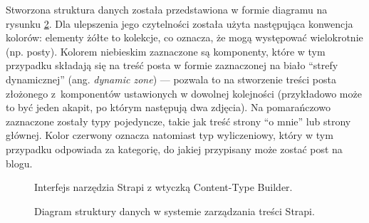 \documentclass[a4paper, 12pt, twoside]{article}
\numberwithin{figure}{section}
\begin{document}
\begin{sloppypar}
Stworzona struktura danych została przedstawiona w formie diagramu na rysunku \ref{fig:diagram-typu-tresci.png}. Dla ulepszenia jego czytelności została użyta następująca konwencja kolorów: elementy żółte to kolekcje, co oznacza, że mogą występować wielokrotnie (np. posty). Kolorem niebieskim zaznaczone są komponenty, które w tym przypadku składają się na treść posta w formie zaznaczonej na biało ``strefy dynamicznej'' (ang. \textit{dynamic zone}) --- pozwala to na stworzenie treści posta złożonego z~komponentów ustawionych w dowolnej kolejności (przykładowo może to być jeden akapit, po którym następują dwa zdjęcia). Na pomarańczowo zaznaczone zostały typy pojedyncze, takie jak treść strony ``o mnie'' lub strony głównej. Kolor czerwony oznacza natomiast typ wyliczeniowy, który w tym przypadku odpowiada za kategorię, do jakiej przypisany może zostać post na blogu.

\begin{figure}[H] 
    \centering
   \caption{Interfejs narzędzia Strapi z wtyczką Content-Type Builder.}
   \label{fig:strapi-interface-1.jpg}
\end{figure}

\begin{figure}[H] 
    \centering
   \caption{Diagram struktury danych w systemie zarządzania treści Strapi.}
   \label{fig:diagram-typu-tresci.png}
\end{figure}


\end{sloppypar}
\end{document}
